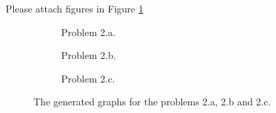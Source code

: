 \documentclass{hw}
\begin{document}
\begin{solution}
Please attach figures in Figure \ref{fig:three_images}

\begin{figure}[h!]
    \centering
    
    \begin{subfigure}{.32\textwidth}
        \centering

        \caption{Problem 2.a.}
    \end{subfigure}%
    \hfill
    \begin{subfigure}{.32\textwidth}
        \centering

        \caption{Problem 2.b.}
    \end{subfigure}%
    \hfill
    \begin{subfigure}{.32\textwidth}
        \centering

        \caption{Problem 2.c.}
    \end{subfigure}
    
    \caption{The generated graphs for the problems 2.a, 2.b and 2.c.}
    \label{fig:three_images}
\end{figure}
\end{solution}
\newpage

\end{document}
